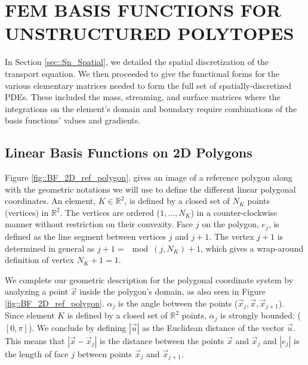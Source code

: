 %
%
%
\chapter{\uppercase {FEM Basis Functions for Unstructured Polytopes}}
\label{sec::BF}

In Section \ref{sec::Sn_Spatial}, we detailed the spatial discretization of the transport equation. We then proceeded to give the functional forms for the various elementary matrices needed to form the full set of spatially-discretized PDEs. These included the mass, streaming, and surface matrices where the integrations on the element's domain and boundary require combinations of the basis functions' values and gradients.

\section{Linear Basis Functions on 2D Polygons}
\label{sec::BF_2DLinear}

Figure \ref{fig::BF_2D_ref_polygon}, gives an image of a reference polygon along with the geometric notations we will use to define the different linear polygonal coordinates. An element, $K\in \mathbb{R}^2$, is defined by a closed set of $N_K$ points (vertices) in $\mathbb{R}^2$. The vertices are ordered ($1,...,N_K$) in a counter-clockwise manner without restriction on their convexity. Face $j$ on the polygon, $e_j$, is defined as the line segment between vertices $j$ and $j+1$. The vertex $j+1$ is determined in general as $j+1 =\mod(j,N_K)+1$, which gives a wrap-around definition of vertex $N_K+1 = 1$.

We complete our geometric description for the polygonal coordinate system by analyzing a point $\vec{x}$ inside the polygon's domain, as also seen in Figure \ref{fig::BF_2D_ref_polygon}. $\alpha_j$ is the angle between the points ($\vec{x}_j, \vec{x}, \vec{x}_{j+1}$). Since element $K$ is defined by a closed set of $\mathbb{R}^2$ points, $\alpha_j$ is strongly bounded: ($[0, \pi]$). We conclude by defining $|\vec{u}|$ as the Euclidean distance of the vector $\vec{u}$. This means that $|\vec{x} - \vec{x}_j|$ is the distance between the points $\vec{x}$ and $\vec{x}_j$ and $|e_j|$ is the length of face $j$ between points $\vec{x}_j$ and $\vec{x}_{j+1}$.

